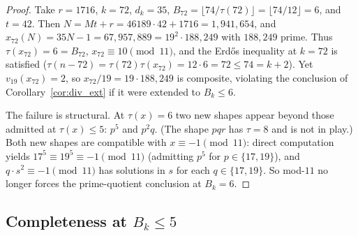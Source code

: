 \documentclass[11pt]{article}
\renewcommand{\_}{\origunderscore\allowbreak}
\theoremstyle{definition}
\theoremstyle{remark}
\begin{document}
\begin{proof}
Take $r=1716$, $k=72$, $d_k=35$, $B_{72}=\lfloor 74/\tau(72)\rfloor=\lfloor 74/12\rfloor=6$, and $t=42$. Then
$N=Mt+r=46189\cdot 42+1716=1{,}941{,}654$, and
$x_{72}(N)=35N-1=67{,}957{,}889=19^2\cdot 188{,}249$ with
$188{,}249$ prime. Thus $\tau(x_{72})=6=B_{72}$, $x_{72}\equiv 10\pmod{11}$, and the Erd\H{o}s inequality at $k=72$ is satisfied
($\tau(n-72)=\tau(72)\tau(x_{72})=12\cdot 6=72\le 74=k+2$). Yet
$v_{19}(x_{72})=2$, so $x_{72}/19=19\cdot 188{,}249$ is composite,
violating the conclusion of Corollary~\ref{cor:div_ext} if it were
extended to $B_k\le 6$.

The failure is structural. At $\tau(x)=6$ two new shapes appear
beyond those admitted at $\tau(x)\le 5$: $p^5$ and $p^2q$. (The
shape $pqr$ has $\tau=8$ and is not in play.) Both new shapes are
compatible with $x\equiv -1\pmod{11}$: direct computation yields
$17^5\equiv 19^5\equiv -1\pmod{11}$ (admitting $p^5$ for
$p\in\{17,19\}$), and $q\cdot s^2\equiv -1\pmod{11}$ has solutions
in $s$ for each $q\in\{17,19\}$. So mod-$11$ no longer forces the
prime-quotient conclusion at $B_k=6$.
\end{proof}

\subsection{Completeness at $B_k\le 5$}
\end{document}
